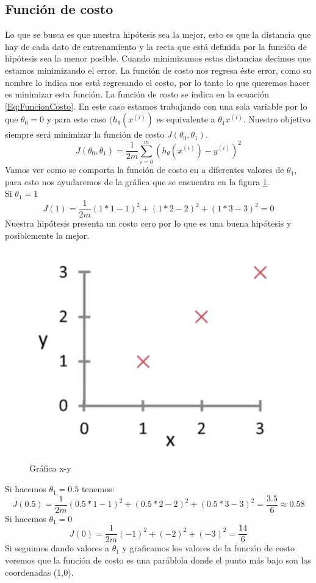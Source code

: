 \documentclass{report}
\begin{document}
\subsection{Función de costo}
Lo que se busca es que nuestra hipótesis sea la mejor, esto es que la distancia que hay de cada dato de entrenamiento y la recta que está definida por la función de hipótesis sea la menor posible. Cuando minimizamos estas distancias decimos que estamos minimizando el error. La función de costo nos regresa éste error, como su nombre lo indica nos está regresando el costo, por lo tanto lo que queremos hacer es minimizar esta función. La función de costo se indica en la ecuación \ref{Eq:FuncionCosto}. En este caso estamos trabajando con una sola variable por lo que $\theta_0=0$ y para este caso $(h_\theta(x^{(i)})$ es equivalente a $\theta_1x^{(i)}$. Nuestro objetivo siempre será minimizar la función de costo $J(\theta_0, \theta_1)$.
\begin{equation}
	J(\theta_0, \theta_1)=\frac{1}{2m}\sum_{i=0}^{m}(h_\theta(x^{(i)})-y^{(i)})^2
	\label{Eq:FuncionCosto}
\end{equation}
Vamos ver como se comporta la función de costo en a diferentes valores de $\theta_1$, para esto nos ayudaremos de la gráfica que se encuentra en la figura \ref{Fig:G1}.\\
Si $\theta_1=1$
\[
J(1)=\frac{1}{2m}(1*1-1)^2+(1*2-2)^2+(1*3-3)^2=0
\]
Nuestra hipótesis presenta un costo cero por lo que es una buena hipótesis y posiblemente la mejor.
\begin{figure}[hb]
	\centering
	\includegraphics[scale=0.25]{img/Grafica}
	\caption{Gráfica x-y}
	\label{Fig:G1}
\end{figure}
Si hacemos $\theta_1=0.5$ tenemos:
\[
	J(0.5)=\frac{1}{2m}(0.5*1-1)^2+(0.5*2-2)^2+(0.5*3-3)^2=\frac{3.5}{6}\approx0.58
\]
Si hacemos $\theta_1=0$
\[
J(0)=\frac{1}{2m}(-1)^2+(-2)^2+(-3)^2=\frac{14}{6}
\]
Si seguimos dando valores a $\theta_1$ y graficamos los valores de la función de costo veremos que la función de costo es una paráblola donde el punto más bajo son las coordenadas (1,0).
\end{document}
